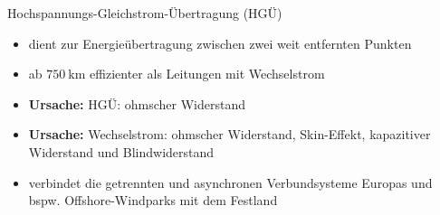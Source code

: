 \documentclass[aspectratio=1610, professionalfonts, 9pt]{beamer}
\begin{document}
  \begin{frame}

  \begin{block}{Hochspannungs-Gleichstrom-Übertragung (HGÜ)}
    \begin{itemize}
      \item dient zur Energieübertragung zwischen zwei weit entfernten Punkten
      \item ab $\SI{750}{\kilo\meter}$ effizienter als Leitungen mit Wechselstrom
  \item[] \textbf{\textcolor{tugreen}{Ursache:}} HGÜ: ohmscher Widerstand
  \item[] \textbf{\textcolor{tulight}{Ursache:}} Wechselstrom: ohmscher Widerstand, Skin-Effekt, kapazitiver Widerstand und Blindwiderstand
      \item verbindet die getrennten und asynchronen Verbundsysteme Europas und bspw. Offshore-Windparks mit dem Festland
      \end{itemize}
\end{block}
\end{frame}
\end{document}
